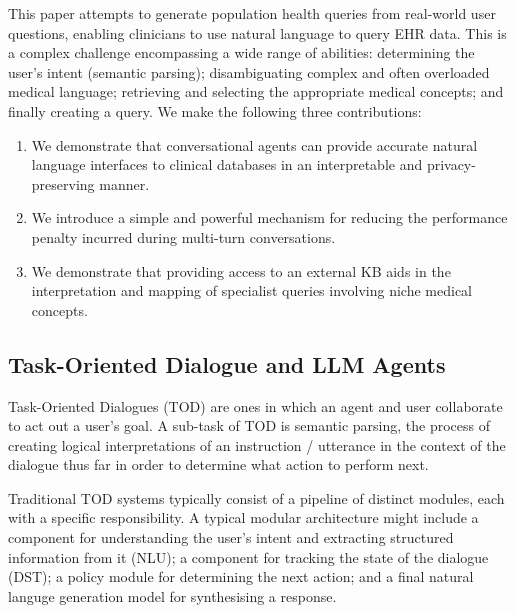 \documentclass[11pt]{article}
\begin{document}
This paper attempts to generate population health queries from real-world user questions, enabling clinicians to use natural language to query EHR data. 
This is a complex challenge encompassing a wide range of abilities: determining the user's intent (semantic parsing); disambiguating complex and often overloaded medical language; retrieving and selecting the appropriate medical concepts; and finally creating a query.
We make the following three contributions:

\begin{enumerate}

\item We demonstrate that conversational agents can provide accurate natural language interfaces to clinical databases in an interpretable and privacy-preserving manner.

\item We introduce a simple and powerful mechanism for reducing the performance penalty incurred during multi-turn conversations. %

\item We demonstrate that providing access to an external KB aids in the interpretation and mapping of specialist queries involving niche medical concepts.
\end{enumerate}


\subsection{Task-Oriented Dialogue and LLM Agents}
Task-Oriented Dialogues (TOD) are ones in which an agent and user collaborate to act out a user's goal.
A sub-task of TOD is semantic parsing, the process of creating logical interpretations of an instruction / utterance in the context of the dialogue thus far in order to determine what action to perform next.

Traditional TOD systems typically consist of a pipeline of distinct modules, each with a specific responsibility.
A typical modular architecture might include a component for understanding the user's intent and extracting structured information from it (NLU); a component for tracking the state of the dialogue (DST); a policy module for determining the next action; and a final natural languge generation model for synthesising a response.  
\end{document}
